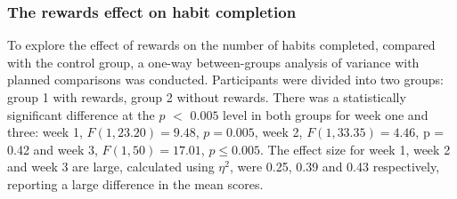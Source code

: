 \documentclass{scaffold/sigchi}
\begin{document}





\subsubsection{The rewards effect on habit completion}
To explore the effect of rewards on the number of habits completed, compared with the control group, a one-way between-groups analysis of variance with planned comparisons was conducted. Participants were divided into two groups: group 1 with rewards, group 2 without rewards. There was a statistically significant difference at the $p$ $<$ $0.005$ level in both groups for week one and three: week 1, $F(1,23.20) = 9.48$, $p = 0.005$, week 2, $F(1,33.35) = 4.46$, p = 0.42 and week 3, $F(1,50) = 17.01$, $p\leq 0.005$. The effect size for week 1, week 2 and week 3 are large, calculated using $\eta^{2}$, were 0.25, 0.39 and 0.43 respectively, reporting a large difference in the mean scores.
\end{document}
